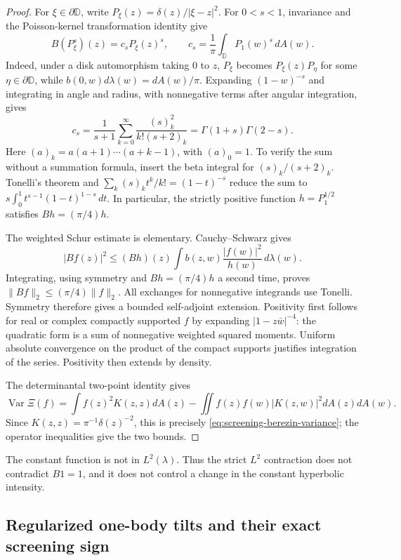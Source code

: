 \documentclass[11pt,a4paper]{article}
\numberwithin{equation}{section}
\theoremstyle{definition}
\theoremstyle{remark}
\newcommand{\D}{\mathbb D}
\begin{document}
\begin{proof}
For $\xi\in\partial\D$, write
$P_\xi(z)=\delta(z)/|\xi-z|^2$.  For $0<s<1$, invariance and the
Poisson-kernel transformation identity give
\[
 B(P_\xi^s)(z)=c_sP_\xi(z)^s,\qquad
 c_s=\frac1\pi\int_\D P_1(w)^s\,dA(w).
\]
Indeed, under a disk automorphism taking $0$ to $z$, $P_\xi$ becomes
$P_\xi(z)P_\eta$ for some $\eta\in\partial\D$, while
$b(0,w)d\lambda(w)=dA(w)/\pi$.  Expanding
$(1-w)^{-s}$ and integrating in angle and radius, with nonnegative
terms after angular integration, gives
\[
 c_s=\frac1{s+1}\sum_{k=0}^\infty
       \frac{(s)_k^2}{k!(s+2)_k}
     =\Gamma(1+s)\Gamma(2-s).
\]
Here $(a)_k=a(a+1)\cdots(a+k-1)$, with $(a)_0=1$.  To verify the
sum without a summation formula, insert the beta integral for
$(s)_k/(s+2)_k$.  Tonelli's theorem and
$\sum_k(s)_kt^k/k!=(1-t)^{-s}$ reduce the sum to
$s\int_0^1t^{s-1}(1-t)^{1-s}\,dt$.
In particular, the strictly positive function $h=P_1^{1/2}$ satisfies
$Bh=(\pi/4)h$.

The weighted Schur estimate is elementary.  Cauchy--Schwarz gives
\[
 |Bf(z)|^2\le (Bh)(z)
       \int b(z,w)\frac{|f(w)|^2}{h(w)}\,d\lambda(w).
\]
Integrating, using symmetry and $Bh=(\pi/4)h$ a second time, proves
$\|Bf\|_2\le(\pi/4)\|f\|_2$.  All exchanges for nonnegative
integrands use Tonelli.  Symmetry therefore gives a bounded
self-adjoint extension.  Positivity first follows for real or complex
compactly supported $f$ by expanding
$|1-z\bar w|^{-4}$: the quadratic form is a sum of nonnegative
weighted squared moments.  Uniform absolute convergence on the
product of the compact supports justifies integration of the series.
Positivity then extends by density.

The determinantal two-point identity gives
\[
 \operatorname{Var}\Xi(f)=\int f(z)^2K(z,z)dA(z)
       -\iint f(z)f(w)|K(z,w)|^2dA(z)dA(w).
\]
Since $K(z,z)=\pi^{-1}\delta(z)^{-2}$, this is precisely
\eqref{eq:screening-berezin-variance}; the operator inequalities give
the two bounds.
\end{proof}

The constant function is not in $L^2(\lambda)$.  Thus the strict
$L^2$ contraction does not contradict $B1=1$, and it does not control
a change in the constant hyperbolic intensity.

\subsection{Regularized one-body tilts and their exact screening sign}
\end{document}
